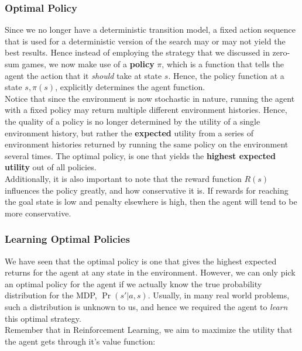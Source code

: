 \documentclass[12pt]{article}
\begin{document}
\subsubsection{Optimal Policy}

Since we no longer have a deterministic transition model, a fixed action sequence that is used for a deterministic version of the search may or may not yield the best results. Hence instead of employing the strategy that we discussed in zero-sum games, we now make use of a \textbf{policy} $\pi$, which is a function that tells the agent the action that it \textit{should} take at state $s$. Hence, the policy function at a state $s, \pi(s)$, explicitly determines the agent function.\\

 Notice that since the environment is now stochastic in nature, running the agent with a fixed policy may return multiple different environment histories. Hence, the quality of a policy is no longer determined by the utility of a single environment history, but rather the \textbf{expected} utility from a series of environment histories returned by running the same policy on the environment several times. The optimal policy, is one that yields the \textbf{highest expected utility} out of all policies.\\
 
 Additionally, it is also important to note that the reward function $R(s)$ influences the policy greatly, and how conservative it is. If rewards for reaching the goal state is low and penalty elsewhere is high, then the agent will tend to be more conservative.
 
 \subsubsection{Learning Optimal Policies}
 
We have seen that the optimal policy is one that gives the highest expected returns for the agent at any state in the environment. However, we can only pick an optimal policy for the agent if we actually know the true probability distribution for the MDP, $\Pr(s' | a, s)$. Usually, in many real world problems, such a distribution is unknown to us, and hence we required the agent to \textit{learn} this optimal strategy.\\
 
 Remember that in Reinforcement Learning, we aim to maximize the utility that the agent gets through it's value function:
 
\end{document}
